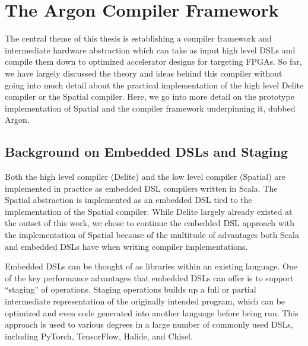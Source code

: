 \chapter{The Argon Compiler Framework}
\label{argon}

The central theme of this thesis is establishing a compiler framework and
intermediate hardware abstraction which can
take as input high level DSLs and compile them down to optimized accelerator
designs for targeting FPGAs. So far, we have largely discussed the theory
and ideas behind this compiler without going into much detail about the practical
implementation of the high level Delite compiler or the Spatial compiler.
Here, we go into more detail on the prototype implementation of Spatial
and the compiler framework underpinning it, dubbed Argon.

\section{Background on Embedded DSLs and Staging}
Both the high level compiler (Delite) and the low level compiler (Spatial)
are implemented in practice as embedded DSL compilers written in Scala. The Spatial
abstraction is implemented as an embedded DSL tied to the
implementation of the Spatial compiler.
While Delite largely already existed at the outset of this work, we chose to
continue the embedded DSL approach with the implementation of Spatial because of the
multitude of advantages both Scala and embedded DSLs have when writing compiler
implementations.

Embedded DSLs can be thought of as libraries within an existing language.
One of the key performance advantages that embedded DSLs can offer is to support
``staging'' of operations. Staging operations builds up a full or partial
intermediate representation of the originally intended program,
which can be optimized and even code generated into another language before being run.
This approach is used to various degrees in a large number of commonly used
DSLs, including PyTorch, TensorFlow, Halide, and Chisel.

